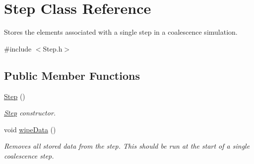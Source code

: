 \hypertarget{struct_step}{}\section{Step Class Reference}
\label{struct_step}


Stores the elements associated with a single step in a coalescence simulation.  




{\ttfamily \#include $<$Step.\+h$>$}

\subsection*{Public Member Functions}
\begin{DoxyCompactItemize}
\item 
\hyperlink{struct_step_a3f66a321aa9c417352a75c85cff5aca5}{Step} ()
\begin{DoxyCompactList}\small\item\em \hyperlink{struct_step}{Step} constructor. \end{DoxyCompactList}\item 
void \hyperlink{struct_step_ac70e891f944dbeba29bfd1d168b9593c}{wipe\+Data} ()\hypertarget{struct_step_ac70e891f944dbeba29bfd1d168b9593c}{}\label{struct_step_ac70e891f944dbeba29bfd1d168b9593c}

\begin{DoxyCompactList}\small\item\em Removes all stored data from the step. This should be run at the start of a single coalescence step. \end{DoxyCompactList}\end{DoxyCompactItemize}
